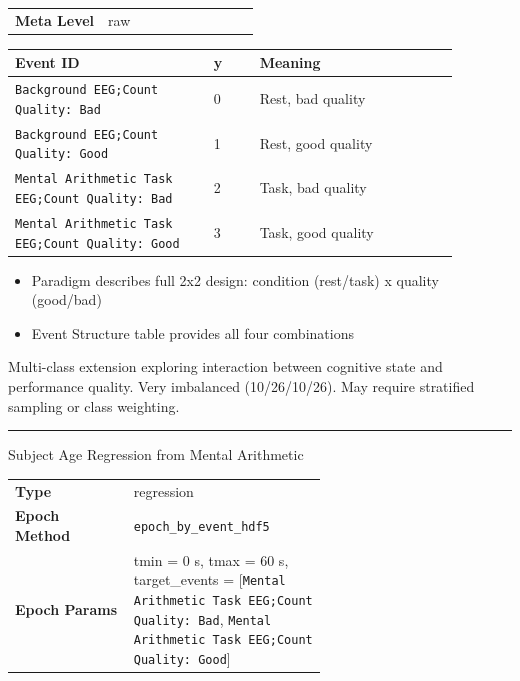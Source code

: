 {\begin{tcolorbox}
{\begin{tabular}{@{}lp{0.62\linewidth}@{}}
\textbf{Meta Level} & raw \\
\end{tabular}}
\par{}\par\smallskip
\begingroup\footnotesize
\begin{tabular}{@{}p{0.3911\linewidth}p{0.0978\linewidth}p{0.3911\linewidth}@{}}
\toprule
\textbf{Event ID} & \textbf{y} & \textbf{Meaning} \\
\midrule
\texttt{Background EEG;Count Quality: Bad} & 0 & Rest, bad quality \\
\texttt{Background EEG;Count Quality: Good} & 1 & Rest, good quality \\
\texttt{Mental Arithmetic Task EEG;Count Quality: Bad} & 2 & Task, bad quality \\
\texttt{Mental Arithmetic Task EEG;Count Quality: Good} & 3 & Task, good quality \\
\bottomrule
\end{tabular}
\endgroup
\par{}\par
\begin{itemize}[leftmargin=1.3em,noitemsep,topsep=1pt]
\item[\scriptsize$\cdot$] {\scriptsize Paradigm describes full 2x2 design: condition (rest/task) x quality (good/bad)}
\item[\scriptsize$\cdot$] {\scriptsize Event Structure table provides all four combinations}
\end{itemize}
\par{} {\footnotesize Multi-class extension exploring interaction between cognitive state and performance quality. Very imbalanced (10/26/10/26). May require stratified sampling or class weighting.}
\noindent\rule{\linewidth}{0.4pt}\par\nopagebreak
{} {\footnotesize Subject Age Regression from Mental Arithmetic}\par\smallskip
{\footnotesize\begin{tabular}{@{}lp{0.62\linewidth}@{}}
\textbf{Type} & regression \\
\textbf{Epoch Method} & \texttt{epoch\_by\_event\_hdf5} \\
\textbf{Epoch Params} & tmin = 0 s, tmax = 60 s, target\_events = [\texttt{Mental Arithmetic Task EEG;Count Quality: Bad}, \texttt{Mental Arithmetic Task EEG;Count Quality: Good}] \\

\end{tabular}}
\end{tcolorbox}}
